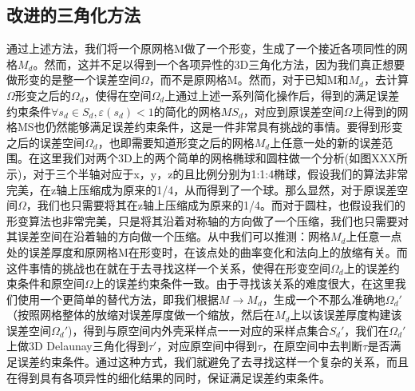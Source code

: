 \subsection{改进的三角化方法}
通过上述方法，我们将一个原网格M做了一个形变，生成了一个接近各项同性的网格$M_d$。然而，这并不足以得到一个各项异性的3D三角化方法，因为我们真正想要做形变的是整一个误差空间$\Omega$，而不是原网格M。然而，对于已知M和$M_d$，去计算$\Omega$形变之后的$\Omega_d$，使得在空间$\Omega_d$上通过上述一系列简化操作后，得到的满足误差约束条件$\forall s_d \in S_d, \varepsilon(s_d)<1$的简化的网格$MS_d$，对应到原误差空间$\Omega$上得到的网格MS也仍然能够满足误差约束条件，这是一件非常具有挑战的事情。要得到形变之后的误差空间$\Omega_d$，也即需要知道形变之后的网格$M_d$上任意一处的新的误差范围。在这里我们对两个3D上的两个简单的网格椭球和圆柱做一个分析(如图XXX所示)，对于三个半轴对应于x，y，z的且比例分别为1:1:4椭球，假设我们的算法非常完美，在z轴上压缩成为原来的1/4，从而得到了一个球。那么显然，对于原误差空间$\Omega$，我们也只需要将其在z轴上压缩成为原来的1/4。而对于圆柱，也假设我们的形变算法也非常完美，只是将其沿着对称轴的方向做了一个压缩，我们也只需要对其误差空间在沿着轴的方向做一个压缩。从中我们可以推测：网格$M_d$上任意一点处的误差厚度和原网格M在形变时，在该点处的曲率变化和法向上的放缩有关。而这件事情的挑战也在就在于去寻找这样一个关系，使得在形变空间$\Omega_d$上的误差约束条件和原空间$\Omega$上的误差约束条件一致。由于寻找该关系的难度很大，在这里我们使用一个更简单的替代方法，即我们根据$M \to M_d$，生成一个不那么准确地$\Omega_d'$ （按照网格整体的放缩对误差厚度做一个缩放，然后在$M_d$上以该误差厚度构建该误差空间$\Omega_d'$)，得到与原空间内外壳采样点一一对应的采样点集合$S_d′$，我们在$\Omega_d'$上做3D Delaunay三角化得到$\tau′$，对应原空间中得到$\tau$，在原空间中去判断$\tau$是否满足误差约束条件。通过这种方式，我们就避免了去寻找这样一个复杂的关系，而且在得到具有各项异性的细化结果的同时，保证满足误差约束条件。

